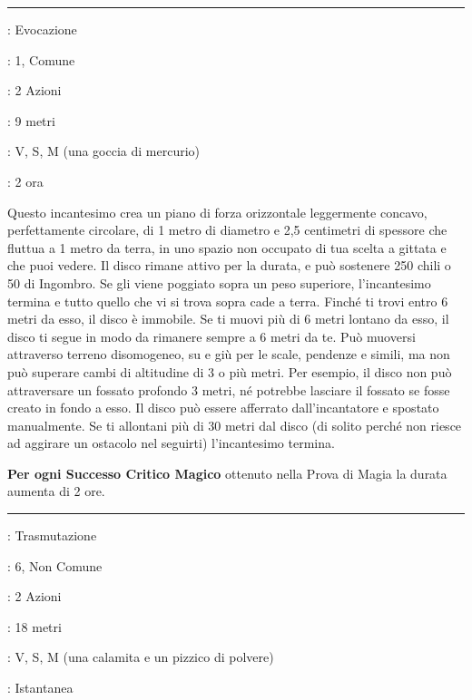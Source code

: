 \begin{multicols}{2}
\smallskip\noindent\rule{\linewidth}{2pt} \hypertarget{Disco Fluttuante}{}\smallskip{}
\noindent
\begin{description}[noitemsep, topsep=0pt, parsep=0pt, partopsep=0pt, leftmargin=0cm, labelwidth=2.8cm]
	\item[\textbf{Lista di Magia}]: Evocazione
	\item[\textbf{Livello}]: 1, Comune
	\item[\textbf{T. di Lancio}]: 2 Azioni
	\item[\textbf{Gittata}]: 9 metri
	\item[\textbf{Componenti}]: V, S, M (una goccia di mercurio)
	\item[\textbf{Durata}]: 2 ora
\end{description}

Questo incantesimo crea un piano di forza orizzontale leggermente concavo, perfettamente circolare, di 1 metro di diametro e 2,5 centimetri di spessore che fluttua a 1 metro da terra, in uno spazio non occupato di tua scelta a gittata e che puoi vedere. Il disco rimane attivo per la durata, e può sostenere 250 chili o 50 di Ingombro. Se gli viene poggiato sopra un peso superiore, l'incantesimo termina e tutto quello che vi si trova sopra cade a terra. Finché ti trovi entro 6 metri da esso, il disco è immobile. Se ti muovi più di 6 metri lontano da esso, il disco ti segue in modo da rimanere sempre a 6 metri da te. Può muoversi attraverso terreno disomogeneo, su e giù per le scale, pendenze e simili, ma non può superare cambi di altitudine di 3 o più metri. Per esempio, il disco non può attraversare un fossato profondo 3 metri, né potrebbe lasciare il fossato se fosse creato in fondo a esso. Il disco può essere afferrato dall'incantatore e spostato manualmente. Se ti allontani più di 30 metri dal disco (di solito perché non riesce ad aggirare un ostacolo nel seguirti) l'incantesimo termina.

\textbf{Per ogni Successo Critico Magico} ottenuto nella Prova di Magia la durata aumenta di 2 ore.

\smallskip\noindent\rule{\linewidth}{2pt} \hypertarget{Disintegrazione}{}\smallskip{}
\noindent
\begin{description}[noitemsep, topsep=0pt, parsep=0pt, partopsep=0pt, leftmargin=0cm, labelwidth=2.8cm]
	\item[\textbf{Lista di Magia}]: Trasmutazione
	\item[\textbf{Livello}]: 6, Non Comune
	\item[\textbf{T. di Lancio}]: 2 Azioni
	\item[\textbf{Gittata}]: 18 metri
	\item[\textbf{Componenti}]: V, S, M (una calamita e un pizzico di polvere)
	\item[\textbf{Durata}]: Istantanea
\end{description}


\end{multicols}
